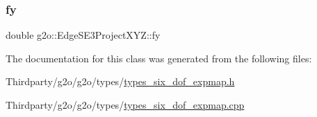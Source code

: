 \subsubsection{\texorpdfstring{fy}{fy}}
{\footnotesize\ttfamily double g2o\+::\+Edge\+S\+E3\+Project\+X\+Y\+Z\+::fy}



The documentation for this class was generated from the following files\+:\begin{DoxyCompactItemize}
\item 
Thirdparty/g2o/g2o/types/\mbox{\hyperlink{types__six__dof__expmap_8h}{types\+\_\+six\+\_\+dof\+\_\+expmap.\+h}}\item 
Thirdparty/g2o/g2o/types/\mbox{\hyperlink{types__six__dof__expmap_8cpp}{types\+\_\+six\+\_\+dof\+\_\+expmap.\+cpp}}\end{DoxyCompactItemize}
